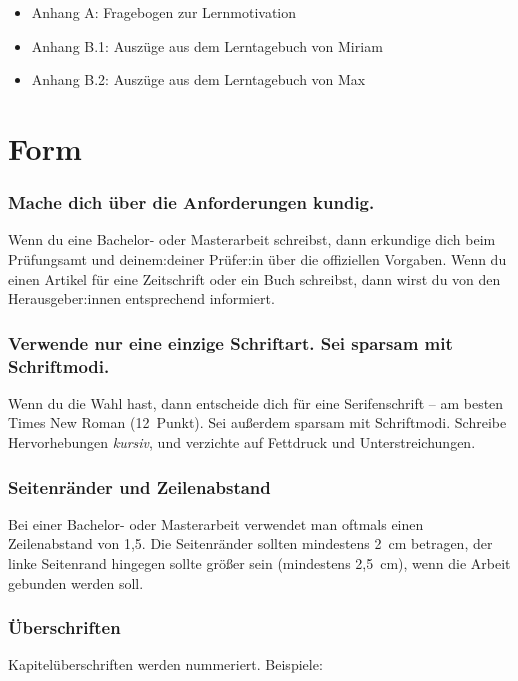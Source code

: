 \documentclass{../cssheet}
\begin{document}
\begin{itemize}
\item
  Anhang A: Fragebogen zur Lernmotivation
\item
  Anhang B.1: Auszüge aus dem Lerntagebuch von Miriam
\item
  Anhang B.2: Auszüge aus dem Lerntagebuch von Max
\end{itemize}

\section{Form}

\subsubsection*{Mache dich über die Anforderungen kundig.}

Wenn du eine Bachelor- oder Masterarbeit schreibst, dann erkundige dich beim Prüfungsamt und deinem:deiner Prüfer:in über die offiziellen Vorgaben. Wenn du einen Artikel für eine Zeitschrift oder ein Buch schreibst, dann wirst du von den Herausgeber:innen entsprechend informiert.

\subsubsection*{Verwende nur eine einzige Schriftart. Sei sparsam mit Schriftmodi.}

Wenn du die Wahl hast, dann entscheide dich für eine Serifenschrift --
am besten Times New Roman (12~Punkt). Sei außerdem sparsam mit Schriftmodi.
Schreibe Hervorhebungen \emph{kursiv}, und verzichte auf Fettdruck und
Unterstreichungen.

\subsubsection*{Seitenränder und Zeilenabstand}

Bei einer Bachelor- oder Masterarbeit verwendet man oftmals einen Zeilenabstand von 1,5. Die Seitenränder sollten mindestens 2~cm betragen, der linke Seitenrand hingegen sollte größer sein (mindestens 2,5~cm), wenn die Arbeit gebunden werden soll.

\subsubsection*{Überschriften}

Kapitelüberschriften werden nummeriert. Beispiele:
\end{document}
